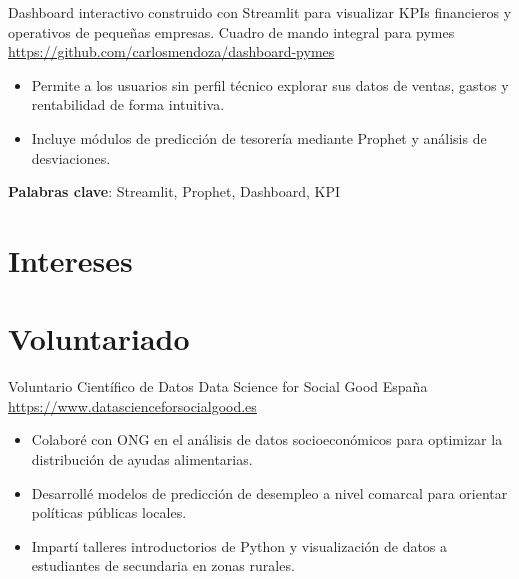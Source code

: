 \documentclass[a4paper, serif, 10pt]{moderncv}
\begin{document}
        {Dashboard interactivo construido con Streamlit para visualizar KPIs financieros y operativos de pequeñas empresas.}
        {Cuadro de mando integral para pymes}
        {\url{https://github.com/carlosmendoza/dashboard-pymes}}
        {}
        {\begin{itemize}
\item Permite a los usuarios sin perfil técnico explorar sus datos de ventas, gastos y rentabilidad de forma intuitiva.
\item Incluye módulos de predicción de tesorería mediante Prophet y análisis de desviaciones.
\end{itemize}
\textbf{Palabras clave}: Streamlit, Prophet, Dashboard, KPI}
\section{Intereses}

\section{Voluntariado}

        {Voluntario Científico de Datos}
        {Data Science for Social Good España}
        {\url{https://www.datascienceforsocialgood.es}}
        {}
        {\begin{itemize}
\item Colaboré con ONG en el análisis de datos socioeconómicos para optimizar la distribución de ayudas alimentarias.
\item Desarrollé modelos de predicción de desempleo a nivel comarcal para orientar políticas públicas locales.
\item Impartí talleres introductorios de Python y visualización de datos a estudiantes de secundaria en zonas rurales.
\end{itemize}}
    
\end{document}
